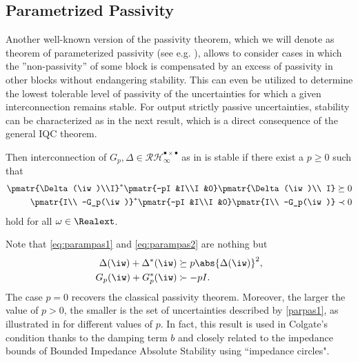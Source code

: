 \subsection{Parametrized Passivity}\label{sec:osppass}
Another well-known version of the passivity theorem, {which we will denote as} theorem of parameterized passivity (see e.g. \cite[Thm. VI.5.10]{desvid}), allows to consider cases in which the ''non-passivity'' of some block is compensated by an excess of passivity in other blocks without endangering stability. This can even be utilized to determine the lowest tolerable level of passivity of the uncertainties for which a given interconnection remains stable. For output strictly passive uncertainties, stability can be characterized as in the next result, which is a direct consequence of the general IQC theorem.

\begin{coroll}\label{thm:desvidpass} {Then interconnection of $G_p,\Delta\in \mathcal{RH}^{\bullet \times \bullet}_\infty$ as in  is stable}
if there exist a ${p\geq 0}$ such that
\begin{align}
\pmatr{\Delta(\iw)\\I}^*\pmatr{-pI &I\\I &0}\pmatr{\Delta(\iw)\\ I} &\succeq 0 \label{eq:parampas1}\\
\pmatr{I\\ -G_p(\iw)}^*\pmatr{-pI &I\\I &0}\pmatr{I\\ -G_p(\iw)} &\prec 0 \label{eq:parampas2}
\end{align} hold for all $\omega\in\Realext$.
\end{coroll}

\begin{rem}Note that \eqref{eq:parampas1} and \eqref{eq:parampas2} are nothing but
\begin{align}
	\Delta(\iw) + \Delta^*(\iw) &\succeq {p\abs{\Delta(\iw)}^2,}\label{parpas1}\\
	G_p(\iw) + G_p^*(\iw) &\succ -pI.\label{parpas2}
\end{align}
The case $p=0$ recovers the classical passivity theorem. Moreover, the larger the value of $p>0$, the smaller is the set of uncertainties described by \eqref{parpas1}, as illustrated in  for different values of $p$. In fact, this result is used in Colgate's condition thanks to the damping term $b$ and closely related to the impedance bounds of Bounded Impedance Absolute Stability \cite{haddadizaad} using ``impedance circles".
\end{rem}

